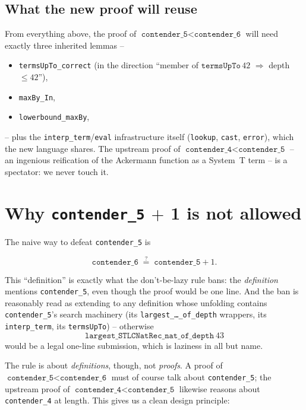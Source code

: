 \documentclass[11pt,a4paper]{article}
\theoremstyle{plain}
\theoremstyle{definition}
\theoremstyle{remark}
\begin{document}
\subsection{What the new proof will reuse}

From everything above, the proof of
$\texttt{contender\_5} < \texttt{contender\_6}$ will need exactly
three inherited lemmas --

\begin{itemize}[leftmargin=2em]
  \item \texttt{termsUpTo\_correct} (in the direction ``member of
        $\texttt{termsUpTo}\,42$ $\Rightarrow$ depth $\leq 42$''),
  \item \texttt{maxBy\_In},
  \item \texttt{lowerbound\_maxBy},
\end{itemize}

-- plus the \texttt{interp\_term}/\texttt{eval} infrastructure itself
(\texttt{lookup}, \texttt{cast}, \texttt{error}), which the new
language shares.  The upstream proof of
$\texttt{contender\_4} < \texttt{contender\_5}$ -- an ingenious
reification of the Ackermann function as a System~T term -- is a
spectator: we never touch it.

\section{Why \texttt{contender\_5}$\,+\,$1 is not allowed}
\label{sec:why-c5-plus-1}

The naive way to defeat \texttt{contender\_5} is

\[
\texttt{contender\_6} \;\overset{?}{=}\; \texttt{contender\_5} + 1.
\]

This ``definition'' is exactly what the don't-be-lazy rule bans: the
\emph{definition} mentions \texttt{contender\_5}, even though the proof
would be one line.  And the ban is reasonably read as extending to any
definition whose unfolding contains \texttt{contender\_5}'s search
machinery (its \texttt{largest\_\dots\_of\_depth} wrappers, its
\texttt{interp\_term}, its \texttt{termsUpTo}) -- otherwise
\[
  \texttt{largest\_STLCNatRec\_nat\_of\_depth}\ 43
\]
would be a legal one-line submission, which is laziness in all but
name.

The rule is about \emph{definitions}, though, not \emph{proofs}.  A
proof of $\texttt{contender\_5} < \texttt{contender\_6}$ must of course
talk about \texttt{contender\_5}; the upstream proof of
$\texttt{contender\_4} < \texttt{contender\_5}$ likewise reasons about
\texttt{contender\_4} at length.  This gives us a clean design
principle:
\end{document}
